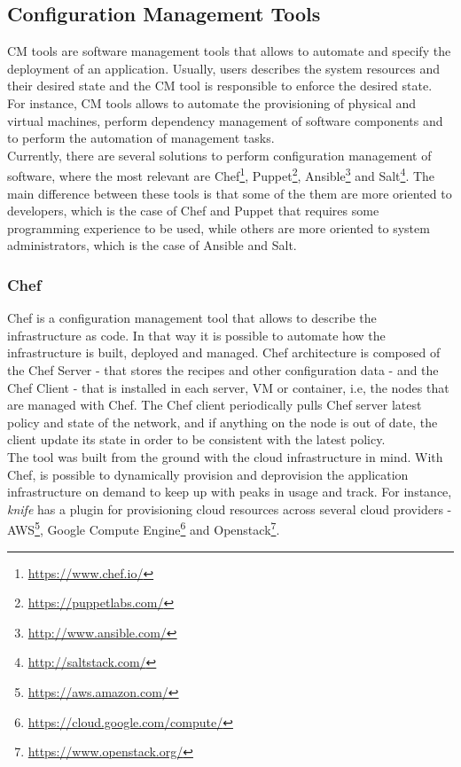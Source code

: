 \subsection{Configuration Management Tools}
\label{sub:cm_tools}
\gls{CM} tools are software management tools that allows to automate and specify the deployment of an
application. Usually, users describes the system resources and their desired state and the \gls{CM}
tool is responsible to enforce the desired state. For instance, \gls{CM} tools allows to automate the
provisioning of physical and virtual machines, perform dependency management of software components
and to perform the automation of management tasks.\\

Currently, there are several solutions to perform configuration management of software, where the
most relevant are Chef\footnote{\url{https://www.chef.io/}}, Puppet\footnote{\url{https://puppetlabs.com/}},
Ansible\footnote{\url{http://www.ansible.com/}} and Salt\footnote{\url{http://saltstack.com/}}. The main difference
between these tools is that some of the them are more oriented to developers, which is the case of Chef and
Puppet that requires some programming experience to be used, while others are more oriented to system
administrators, which is the case of Ansible and Salt.

\subsubsection{Chef}
\label{subs:chef}
Chef is a configuration management tool that allows to describe the infrastructure as code.
In that way it is possible to automate how the infrastructure is built, deployed and managed.
Chef architecture is composed of the Chef Server - that stores the recipes and other configuration
data - and the Chef Client - that is installed in each server, \gls{VM} or container, i.e, the nodes that
are managed with Chef. The Chef client periodically pulls Chef server latest policy and state of the
network, and if anything on the node is out of date, the client update its state in order to be
consistent with the latest policy.\\

The tool was built from the ground with the cloud infrastructure in mind. With Chef, is possible to
dynamically provision and deprovision the application infrastructure on demand to keep up with
peaks in usage and track. For instance, \textit{knife} has a plugin for provisioning cloud resources
across several cloud providers - \gls{AWS}\footnote{\url{https://aws.amazon.com/}}, Google Compute
Engine\footnote{\url{https://cloud.google.com/compute/}} and Openstack\footnote{\url{https://www.openstack.org/}}.\\

